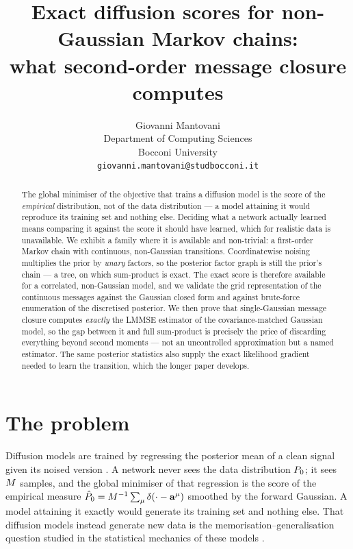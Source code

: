 \documentclass{article}
\title{Exact diffusion scores for non-Gaussian Markov chains:\\
what second-order message closure computes}
\author{%
  Giovanni Mantovani \\
  Department of Computing Sciences \\
  Bocconi University \\
  \texttt{giovanni.mantovani@studbocconi.it}
}
\begin{document}
\maketitle

\begin{abstract}
The global minimiser of the objective that trains a diffusion model is the score of the
\emph{empirical} distribution, not of the data distribution --- a model attaining it would
reproduce its training set and nothing else. Deciding what a network actually learned means
comparing it against the score it should have learned, which for realistic data is unavailable.
We exhibit a family where it is available and non-trivial: a first-order Markov chain with
continuous, non-Gaussian transitions. Coordinatewise noising multiplies the prior by \emph{unary}
factors, so the posterior factor graph is still the prior's chain --- a tree, on which sum-product
is exact. The exact score is therefore available for a correlated, non-Gaussian model, and we
validate the grid representation of the continuous messages against the Gaussian closed form and
against brute-force enumeration of the discretised posterior. We then prove that single-Gaussian
message closure computes \emph{exactly} the LMMSE estimator of the covariance-matched Gaussian
model, so the gap between it and full sum-product is precisely the price of discarding everything
beyond second moments --- not an uncontrolled approximation but a named estimator. The same
posterior statistics also supply the exact likelihood gradient needed to learn the transition,
which the longer paper develops.
\end{abstract}

\section{The problem}

Diffusion models are trained by regressing the posterior mean of a clean signal given its noised
version \citep{sohl2015,ho2020,song2021,vincent2011}. A network never sees the data distribution
$P_0$; it sees $M$ samples, and the global minimiser of that regression is the score of the
empirical measure $\hat P_0 = M^{-1}\sum_\mu\delta(\cdot-\mathbf{a}^\mu)$ smoothed by the forward
Gaussian. A model attaining it exactly would generate its training set and nothing else. That
diffusion models instead generate new data is the memorisation--generalisation question studied in
the statistical mechanics of these models \citep{biroli2023,biroli2024dynamical}.
\end{document}
